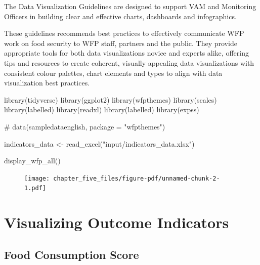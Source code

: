 \documentclass[
  letterpaper,
  DIV=11,
  numbers=noendperiod]{scrreprt}
\newenvironment{Shaded}{\begin{snugshade}}{\end{snugshade}}
\newcommand{\CommentTok}[1]{\textcolor[rgb]{0.37,0.37,0.37}{#1}}
\newcommand{\FunctionTok}[1]{\textcolor[rgb]{0.28,0.35,0.67}{#1}}
\newcommand{\NormalTok}[1]{\textcolor[rgb]{0.00,0.23,0.31}{#1}}
\newcommand{\OtherTok}[1]{\textcolor[rgb]{0.00,0.23,0.31}{#1}}
\newcommand{\StringTok}[1]{\textcolor[rgb]{0.13,0.47,0.30}{#1}}
\begin{document}
The Data Visualization Guidelines are designed to support VAM and
Monitoring Officers in building clear and effective charts, dashboards
and infographics.

These guidelines recommends best practices to effectively communicate
WFP work on food security to WFP staff, partners and the public. They
provide appropriate tools for both data visualizations novice and
experts alike, offering tips and resources to create coherent, visually
appealing data visualizations with consistent colour palettes, chart
elements and types to align with data visualization best practices.

\begin{Shaded}
\begin{Highlighting}[]
\FunctionTok{library}\NormalTok{(tidyverse)}
\FunctionTok{library}\NormalTok{(ggplot2)}
\FunctionTok{library}\NormalTok{(wfpthemes)}
\FunctionTok{library}\NormalTok{(scales)}
\FunctionTok{library}\NormalTok{(labelled)}
\FunctionTok{library}\NormalTok{(readxl)}
\FunctionTok{library}\NormalTok{(labelled)}
\FunctionTok{library}\NormalTok{(expss)}

\CommentTok{\# data(sampledataenglish, package = "wfpthemes")}

\NormalTok{indicators\_data }\OtherTok{\textless{}{-}} \FunctionTok{read\_excel}\NormalTok{(}\StringTok{"input/indicators\_data.xlsx"}\NormalTok{)}
\end{Highlighting}
\end{Shaded}

\begin{Shaded}
\begin{Highlighting}[]
\FunctionTok{display\_wfp\_all}\NormalTok{()}
\end{Highlighting}
\end{Shaded}

\begin{figure}[H]

{\centering \texttt{[image: chapter\_five\_files/figure-pdf/unnamed-chunk-2-1.pdf]}

}

\end{figure}

\hypertarget{visualizing-outcome-indicators}{%
\section{Visualizing Outcome
Indicators}\label{visualizing-outcome-indicators}}

\hypertarget{food-consumption-score}{%
\subsection{Food Consumption Score}\label{food-consumption-score}}
\end{document}
